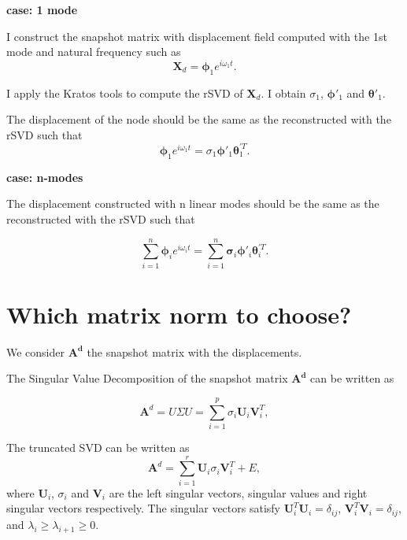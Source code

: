 \documentclass{article}
\begin{document}
\noindent \textbf{case: 1 mode}

I construct the snapshot matrix with displacement field computed with the 1st mode and natural frequency such as 
\begin{equation}
  \bm{X}_d = \bm{\phi}_1 e^{i \omega_1 t}.
\end{equation}

I apply the Kratos tools to compute the rSVD of $\bm{X}_d$. I obtain $\sigma_1$, $\bm{\phi}'_1$ and $\bm{\theta}'_1$.\newline

The displacement of the node should be the same as the reconstructed with the rSVD such that
\begin{equation}
  \bm{\phi}_1 e^{i \omega_1 t} = \sigma_1 \bm{\phi}'_1 \bm{\theta}^{'T}_1. 
\end{equation}

\noindent \textbf{case: n-modes}

The displacement constructed with n linear modes should be the same as the reconstructed with the rSVD such that 

\begin{equation}
  \sum_{i=1}^n \bm{\phi}_i e^{i \omega_i t} = \sum_{i=1}^n \bm{\sigma}_i \bm{\phi}'_i \bm{\theta}^{'T}_i. 
\end{equation}

\section{Which matrix norm to choose?}
We consider $\bm{A^d}$ the snapshot matrix with the displacements. \newline

The Singular Value Decomposition of the snapshot matrix $\bm{A^d}$ can be written as

\begin{equation}
  \bm{A}^d = U \Sigma U =\sum_{i=1}^p \sigma_i \bm{U}_i \bm{V}_i^T,  
\end{equation}

The truncated SVD can be written as
\begin{equation}
  \bm{A}^d = \sum_{i=1}^r \bm{U}_i \sigma_i \bm{V}_i^T + E,
\end{equation}
where $\bm{U}_i$, $\sigma_i$ and $\bm{V}_i$ are the left singular vectors, singular values and right singular vectors respectively. The singular vectors satisfy $\bm{U}_i^T\bm{U}_i=\delta_{ij}$, $\bm{V}_i^T\bm{V}_i=\delta_{ij}$, and $\lambda_i \geq \lambda_{i+1} \geq 0$. \newline
\end{document}
